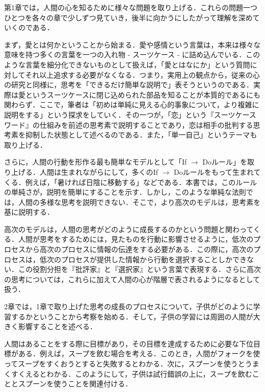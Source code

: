 \documentclass{jarticle}
\begin{document}
第1章では，人間の心を知るために様々な問題を取り上げる．これらの問題一つひとつを各々の章で少しずつ見ていき，後半に向かうにしたがって理解を深めていくのである．

まず，愛とは何かということから始まる．愛や感情という言葉は，本来は様々な意味を持つ多くの言葉を一つの入れ物 - スーツケース - に詰め込んでいる．このような言葉を細分化できないものとして扱えば，「愛とはなにか」という質問に対してそれ以上追求する必要がなくなる．つまり，実用上の観点から，従来の心の研究と同様に，思考を「できるだけ簡単な説明で」表そうというのである．実際は愛というスーツケースに閉じ込められた部品を知ることが本質的であるにも関わらず．ここで，筆者は「初めは単純に見える心的事象について，より複雑に説明をする」という探求をしていく．その一つが，「恋」という『スーツケースワード』の仕組みを前述の思考素で説明することであり，恋は相手の批判する思考素を抑制した状態として述べるのである．また，「単一自己」というテーマも取り上げる．

さらに，人間の行動を形作る最も簡単なモデルとして「If $\to$ Doルール」を取り上げる．人間は生まれながらにして，多くのIf $\to$ Doルールをもって生まれてくる．例えば，「暑ければ日陰に移動する」などである．本書では，このルールの単純さが，説明を簡単にすることを示す．しかし，このような単純な法則では，人間の多様な思考を説明できない．そこで，より高次のモデルは，思考素を基に説明する．

高次のモデルは，人間の思考がどのように成長するのかという問題と関わってくる．人間が思考をするためには，見たものを行動に影響させるように，低次のプロセスから高次のプロセスに情報の伝達をする必要がある．この際に，高次のプロセスは，低次のプロセスが提供した情報から行動を選択することしかできない．この役割分担を『批評家』と『選択家』という言葉で表現する．さらに高次の思考については，これらに加えて人間の心が階層で表されるようになるとして扱う．





2章では，1章で取り上げた思考の成長のプロセスについて，子供がどのように学習するかということから考察を始める．そして，子供の学習には周囲の人間が大きく影響することを述べる．

人間はあることをする際に目標があり，その目標を達成するために必要な下位目標がある．例えば，スープを飲む場合を考える．このとき，人間がフォークを使ってスープをすくおうとすると失敗するとわかる．次に，スプーンを使うとうまくすくえるとわかる．このようにして，子供は試行錯誤の上に，スープを飲むこととスプーンを使うことを関連付ける．
\end{document}
